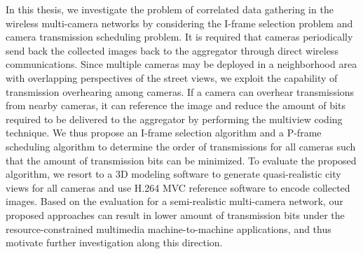 In this thesis, we investigate the problem of correlated data gathering in the wireless multi-camera networks by considering the I-frame selection problem and camera transmission scheduling problem.
It is required that cameras periodically send back the collected images back to the aggregator through direct wireless communications.
Since multiple cameras may be deployed in a neighborhood area with overlapping perspectives of the street views, we exploit the capability of transmission overhearing among cameras.
If a camera can overhear transmissions from nearby cameras, it can reference the image and reduce the amount of bits required to be delivered to the aggregator by performing the multiview coding technique.
We thus propose an I-frame selection algorithm and a P-frame scheduling algorithm to determine the order of transmissions for all cameras such that the amount of transmission bits can be minimized.
To evaluate the proposed algorithm, we resort to a 3D modeling software to generate quasi-realistic city views for all cameras and use H.264 MVC reference software to encode collected images.
Based on the evaluation for a semi-realistic multi-camera network, our proposed approaches can result in lower amount of transmission bits under the resource-constrained multimedia machine-to-machine applications, and thus motivate further investigation along this direction.